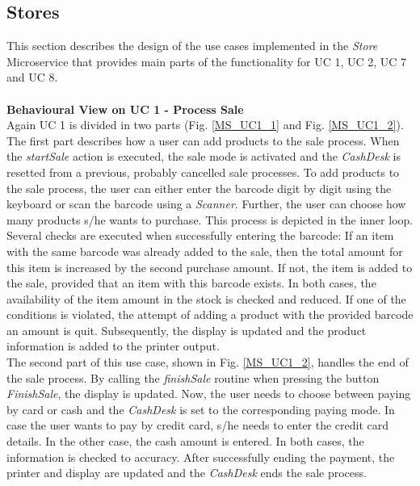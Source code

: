 		\FloatBarrier
			
		\subsection{Stores}
			This section describes the design of the use cases implemented in the \textit{Store} Microservice that provides main parts of the functionality for UC 1, UC 2, UC 7 and UC 8.\\
	
		\noindent
		\\
		\textbf{Behavioural View on UC 1 - Process Sale} \\
		Again UC 1 is divided in two parts (Fig. \ref{MS_UC1_1} and Fig. \ref{MS_UC1_2}).
		The first part describes how a user can add products to the sale process. When the \textit{startSale} action is executed, the sale mode is activated and the \textit{CashDesk} is resetted from a previous, probably cancelled sale processes. To add products to the sale process, the user can either enter the barcode digit by digit using the keyboard or scan the barcode using a \textit{Scanner}. Further, the user can choose how many products s/he wants to purchase. This process is depicted in the inner loop. 
		\\
		Several checks are executed when successfully entering the barcode: If an item with the same barcode was already added to the sale, then the total amount for this item is increased by the second purchase amount. If not, the item is added to the sale, provided that an item with this barcode exists. In both cases, the availability of the item amount in the stock is checked and reduced. If one of the conditions is violated, the attempt of adding a product with the provided barcode an amount is quit. 
		Subsequently, the display is updated and the product information is added to the printer output.
		\\
		The second part of this use case, shown in Fig. \ref{MS_UC1_2}, handles the end of the sale process. By calling the \textit{finishSale} routine when pressing the button \textit{FinishSale}, the display is updated. Now, the user needs to choose between paying by card or cash and the \textit{CashDesk} is set to the corresponding paying mode. In case the user wants to pay by credit card, s/he needs to enter the credit card details. In the other case, the cash amount is entered. In both cases, the information is checked to accuracy.
		After successfully ending the payment, the printer and display are updated and the \textit{CashDesk} ends the sale process.

